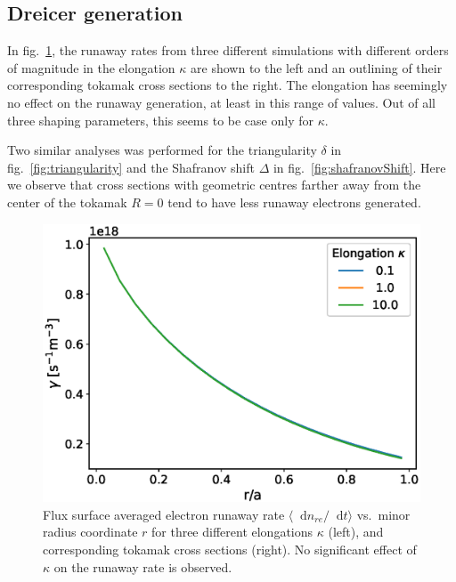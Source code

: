 \documentclass[11pt,a4paper]{article}
\newcommand*\diff{\mathop{}\!\mathrm{d}}
\begin{document}
\subsection{Dreicer generation}
\label{sec:dreicer}
In fig.\ \ref{fig:elongation}, the runaway rates from three different simulations with different orders of magnitude in the elongation $\kappa$ are shown to the left and an outlining of their corresponding tokamak cross sections to the right.
The elongation has seemingly no effect on the runaway generation, at least in this range of values.
Out of all three shaping parameters, this seems to be case only for $\kappa$.

Two similar analyses was performed for the triangularity $\delta$ in fig.\ \ref{fig:triangularity} and the Shafranov shift $\Delta$ in fig.\ \ref{fig:shafranovShift}.
Here we observe that cross sections with geometric centres farther away from the center of the tokamak $R=0$ tend to have less runaway electrons generated.

\begin{figure}[H]
    \centering
    \captionsetup{width=.8\textwidth}
    \includegraphics[width=.8\textwidth]{figs/elongation.eps}
    \caption{Flux surface averaged electron runaway rate $\langle\diff{n}_{re}/\diff{t}\rangle$ vs.\ minor radius coordinate $r$ for three different elongations $\kappa$ (left), and corresponding tokamak cross sections (right).
    No significant effect of $\kappa$ on the runaway rate is observed.}
    \label{fig:elongation}
\end{figure}
\end{document}
